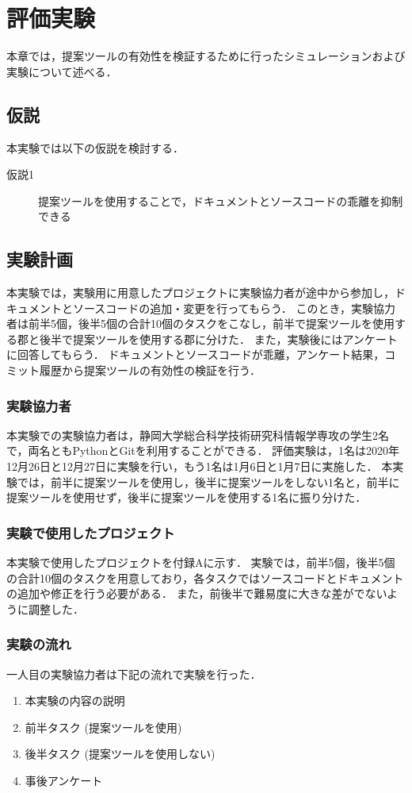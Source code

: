 \chapter{評価実験}
本章では，提案ツールの有効性を検証するために行ったシミュレーションおよび実験について述べる．

\section{仮説}
本実験では以下の仮説を検討する．

\begin{description}
    \item[仮説1] 提案ツールを使用することで，ドキュメントとソースコードの乖離を抑制できる
\end{description}

\section{実験計画}
本実験では，実験用に用意したプロジェクトに実験協力者が途中から参加し，ドキュメントとソースコードの追加・変更を行ってもらう．
このとき，実験協力者は前半5個，後半5個の合計10個のタスクをこなし，前半で提案ツールを使用する郡と後半で提案ツールを使用する郡に分けた．
また，実験後にはアンケートに回答してもらう．
ドキュメントとソースコードが乖離，アンケート結果，コミット履歴から提案ツールの有効性の検証を行う．

\subsection{実験協力者}
本実験での実験協力者は，静岡大学総合科学技術研究科情報学専攻の学生2名で，両名ともPythonとGitを利用することができる．
評価実験は，1名は2020年12月26日と12月27日に実験を行い，もう1名は1月6日と1月7日に実施した．
本実験では，前半に提案ツールを使用し，後半に提案ツールをしない1名と，前半に提案ツールを使用せず，後半に提案ツールを使用する1名に振り分けた．

\subsection{実験で使用したプロジェクト}
本実験で使用したプロジェクトを付録Aに示す．
実験では，前半5個，後半5個の合計10個のタスクを用意しており，各タスクではソースコードとドキュメントの追加や修正を行う必要がある．
また，前後半で難易度に大きな差がでないように調整した．

\subsection{実験の流れ}
一人目の実験協力者は下記の流れで実験を行った．
\begin{enumerate}
    \item 本実験の内容の説明
    \item 前半タスク (提案ツールを使用)
    \item 後半タスク (提案ツールを使用しない)
    \item 事後アンケート
\end{enumerate}

